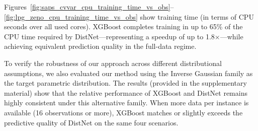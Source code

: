 {Figures~\ref{fig:saps_cvvar_cpu_training_time_vs_obs}--\ref{fig:lpg_zeno_cpu_training_time_vs_obs} show training time (in terms of CPU seconds over all used cores).
XGBoost completes training in up to 65\% of the CPU time required by DistNet—representing a speedup of up to 1.8$\times$—while achieving equivalent prediction quality in the full-data regime.

To verify the robustness of our approach across different distributional assumptions, we also evaluated our method using the Inverse Gaussian family as the target parametric distribution. The results (provided in the supplementary material) show that the relative performance of XGBoost and DistNet remains highly consistent under this alternative family. When more data per instance is available (16 observations or more), XGBoost matches or slightly exceeds the predictive quality of DistNet on the same four scenarios.
}
